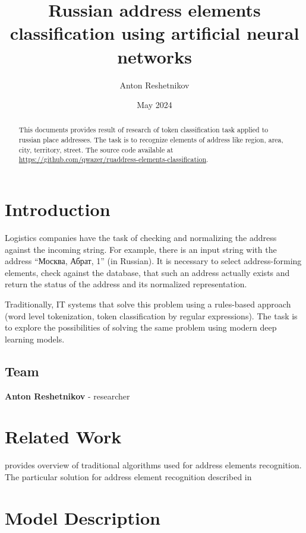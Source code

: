 \documentclass{article}
\title{Russian address elements classification using artificial neural networks}
\author{Anton Reshetnikov}
\date{May 2024}
\begin{document}
\maketitle
\begin{abstract}
    This documents provides result of research of token classification task applied to russian place addresses.
    The task is to recognize elements of address like region, area, city, territory, street.
    The source code available at
     \url{https://github.com/qwazer/ruaddress-elements-classification}.
\end{abstract}



\section{Introduction}


Logistics companies have the task of checking and normalizing the address against the incoming string.
For example, there is an input string with the address ``Москва, Абрат, 1'' (in Russian).
It is necessary to select address-forming elements, check against the database,
that such an address actually exists and return the status of the address and its normalized representation.

Traditionally, IT systems that solve this problem using a rules-based approach (word level tokenization, token classification by regular expressions).
The task is to explore the possibilities of solving the same problem using modern deep learning models.

\subsection{Team}

\textbf{Anton Reshetnikov} - researcher



\section{Related Work}
\label{sec:related}
\cite{makarov2020algo} provides overview of traditional algorithms used for address elements recognition.
The particular solution for address element recognition described in ~\cite{habr2020gar}

\section{Model Description}
\end{document}
